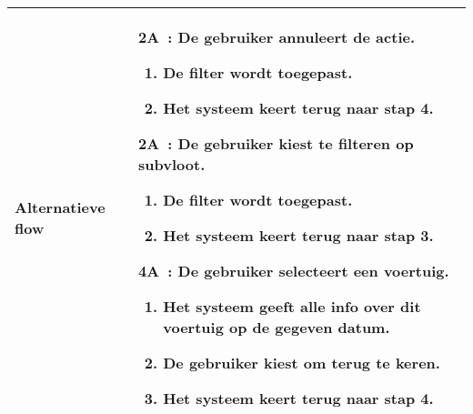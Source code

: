 \documentclass{article}
\begin{document}
\begin{tabularx}{\textwidth}{ | l | X |}
 Alternatieve flow & 
 \textbf{2A~:} De gebruiker annuleert de actie.
 	\begin{enumerate}
 		\item De filter wordt toegepast.
        \item Het systeem keert terug naar stap 4.
 	\end{enumerate}
 \textbf{2A~:} De gebruiker kiest te filteren op subvloot.
 	\begin{enumerate}
 		\item De filter wordt toegepast.
        \item Het systeem keert terug naar stap 3.
 	\end{enumerate}
 	\textbf{4A~:} De gebruiker selecteert een voertuig.
 	\begin{enumerate}
 		\item Het systeem geeft alle info over dit voertuig op de gegeven datum.
        \item De gebruiker kiest om terug te keren.
        \item Het systeem keert terug naar stap 4.
 	\end{enumerate}
    
    
 \\ 
 \hline

 
 
\end{tabularx}


\newpage
\end{document}
